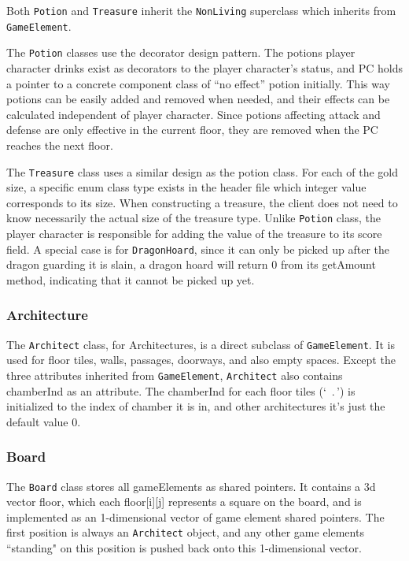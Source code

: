 \documentclass[11pt]{article}
\theoremstyle{plain} \newtheorem{theorem*}{Theorem}[subsection]
\begin{document}
Both \texttt{Potion} and \texttt{Treasure} inherit the \texttt{NonLiving}
superclass which inherits from \texttt{GameElement}.

The \texttt{Potion} classes use the decorator design pattern.  The potions
player character drinks exist as decorators to the player character’s status,
and PC holds a pointer to a concrete component class of “no effect” potion
initially.  This way potions can be easily added and removed when needed, and
their effects can be calculated independent of player character. Since potions
affecting attack and defense are only effective in the current floor, they are
removed when the PC reaches the next floor.  

The \texttt{Treasure} class uses a similar design as the potion class. For each
of the gold size, a specific enum class type exists in the header file which
integer value corresponds to its size. When constructing a treasure, the client
does not need to know necessarily the actual size of the treasure type. Unlike
\texttt{Potion} class, the player character is responsible for adding the value
of the treasure to its score field. A special case is for \texttt{DragonHoard},
since it can only be picked up after the dragon guarding it is slain, a
dragon hoard will return 0 from its \textsf{getAmount} method, 
indicating that it cannot be picked up yet.  


\subsubsection{Architecture}

The \texttt{Architect} class, for Architectures, is a direct subclass 
of \texttt{GameElement}. It is used for floor tiles, walls, passages, doorways,
and also empty spaces. Except the three attributes inherited from
\texttt{GameElement}, \texttt{Architect}
also contains \textsf{chamberInd} as an attribute.
The \textsf{chamberInd} for each floor tiles (`\ .\,') is initialized to
the index of chamber it is in, and other architectures it's just the default
value $0$.


\subsubsection{Board}

The \texttt{Board} class stores all gameElements as shared pointers. 
It contains a 3d vector \textsf{floor}, which each 
\textsf{floor[i][j]} represents a square on the board, and is implemented as an
1-dimensional vector of game element shared pointers. The first position is
always an \texttt{Architect} object, 
and any other game elements ``standing" on this
position is pushed back onto this 1-dimensional vector.
\end{document}
